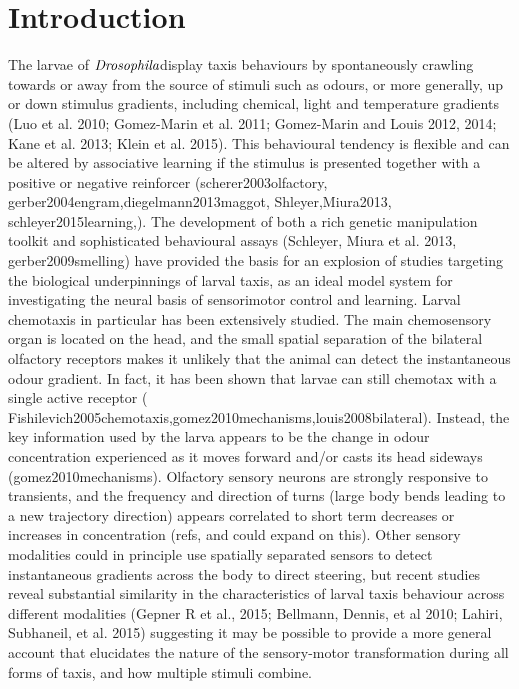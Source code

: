 \documentclass[10pt,a4paper]{article}
\newcommand{\Dros }{$\mathrm{\emph{Drosophila}}$}
\begin{document}
\section{Introduction}
The larvae of \Dros display taxis behaviours by spontaneously crawling towards or away from the source of stimuli such as odours, or more generally, up or down stimulus gradients, including chemical, light and temperature gradients (Luo et al. 2010; Gomez-Marin et al. 2011; Gomez-Marin and Louis 2012, 2014; Kane et al. 2013; Klein et al. 2015). This behavioural tendency is flexible and can be altered by associative learning if the stimulus is presented together with a positive or negative reinforcer (scherer2003olfactory, gerber2004engram,diegelmann2013maggot, Shleyer,Miura2013, schleyer2015learning,). The development of both a rich genetic manipulation toolkit and sophisticated behavioural assays (Schleyer, Miura et al. 2013, gerber2009smelling) have provided the basis for an explosion of studies targeting the biological underpinnings of larval taxis, as an ideal model system for investigating the neural basis of sensorimotor control and learning.
Larval chemotaxis in particular has been extensively studied. The main chemosensory organ is located on the head, and the small spatial separation of the bilateral olfactory receptors makes it unlikely that the animal can detect the instantaneous odour gradient. In fact, it has been shown that larvae can still chemotax with a single active receptor ( Fishilevich2005chemotaxis,gomez2010mechanisms,louis2008bilateral). Instead, the key information used by the larva  appears to be the change in odour concentration experienced as it moves forward and/or casts its head sideways (gomez2010mechanisms). Olfactory sensory neurons are strongly responsive to transients, and the frequency and direction of turns (large body bends leading to a new trajectory direction) appears correlated to short term decreases or increases in concentration (refs, and could expand on this). Other sensory modalities could in principle use spatially separated sensors to detect instantaneous gradients across the body to direct steering, but recent studies reveal substantial similarity in the characteristics of larval taxis behaviour across different modalities (Gepner R et al., 2015; Bellmann, Dennis, et al 2010; Lahiri, Subhaneil, et al. 2015) suggesting it may be possible to provide a more general account that elucidates the nature of the sensory-motor transformation during all forms of taxis, and how multiple stimuli combine. 
\end{document}
